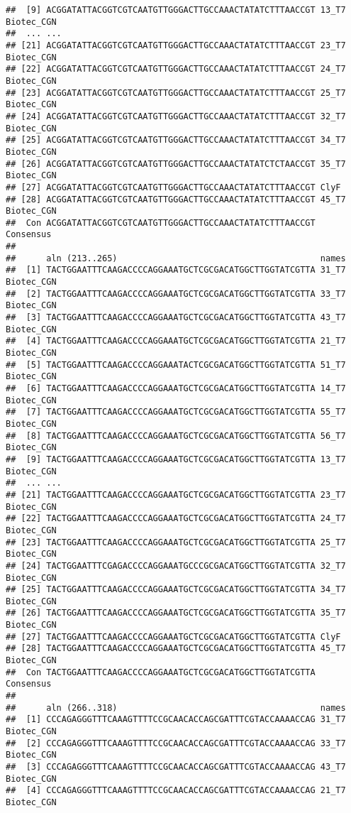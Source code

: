 \documentclass[
]{article}
\begin{document}
\begin{verbatim}
##  [9] ACGGATATTACGGTCGTCAATGTTGGGACTTGCCAAACTATATCTTTAACCGT 13_T7 Biotec_CGN 
##  ... ...
## [21] ACGGATATTACGGTCGTCAATGTTGGGACTTGCCAAACTATATCTTTAACCGT 23_T7 Biotec_CGN
## [22] ACGGATATTACGGTCGTCAATGTTGGGACTTGCCAAACTATATCTTTAACCGT 24_T7 Biotec_CGN
## [23] ACGGATATTACGGTCGTCAATGTTGGGACTTGCCAAACTATATCTTTAACCGT 25_T7 Biotec_CGN
## [24] ACGGATATTACGGTCGTCAATGTTGGGACTTGCCAAACTATATCTTTAACCGT 32_T7 Biotec_CGN
## [25] ACGGATATTACGGTCGTCAATGTTGGGACTTGCCAAACTATATCTTTAACCGT 34_T7 Biotec_CGN
## [26] ACGGATATTACGGTCGTCAATGTTGGGACTTGCCAAACTATATCTCTAACCGT 35_T7 Biotec_CGN
## [27] ACGGATATTACGGTCGTCAATGTTGGGACTTGCCAAACTATATCTTTAACCGT ClyF
## [28] ACGGATATTACGGTCGTCAATGTTGGGACTTGCCAAACTATATCTTTAACCGT 45_T7 Biotec_CGN
##  Con ACGGATATTACGGTCGTCAATGTTGGGACTTGCCAAACTATATCTTTAACCGT Consensus 
## 
##      aln (213..265)                                        names
##  [1] TACTGGAATTTCAAGACCCCAGGAAATGCTCGCGACATGGCTTGGTATCGTTA 31_T7 Biotec_CGN
##  [2] TACTGGAATTTCAAGACCCCAGGAAATGCTCGCGACATGGCTTGGTATCGTTA 33_T7 Biotec_CGN
##  [3] TACTGGAATTTCAAGACCCCAGGAAATGCTCGCGACATGGCTTGGTATCGTTA 43_T7 Biotec_CGN
##  [4] TACTGGAATTTCAAGACCCCAGGAAATGCTCGCGACATGGCTTGGTATCGTTA 21_T7 Biotec_CGN
##  [5] TACTGGAATTTCAAGACCCCAGGAAATACTCGCGACATGGCTTGGTATCGTTA 51_T7 Biotec_CGN
##  [6] TACTGGAATTTCAAGACCCCAGGAAATGCTCGCGACATGGCTTGGTATCGTTA 14_T7 Biotec_CGN
##  [7] TACTGGAATTTCAAGACCCCAGGAAATGCTCGCGACATGGCTTGGTATCGTTA 55_T7 Biotec_CGN
##  [8] TACTGGAATTTCAAGACCCCAGGAAATGCTCGCGACATGGCTTGGTATCGTTA 56_T7 Biotec_CGN
##  [9] TACTGGAATTTCAAGACCCCAGGAAATGCTCGCGACATGGCTTGGTATCGTTA 13_T7 Biotec_CGN 
##  ... ...
## [21] TACTGGAATTTCAAGACCCCAGGAAATGCTCGCGACATGGCTTGGTATCGTTA 23_T7 Biotec_CGN
## [22] TACTGGAATTTCAAGACCCCAGGAAATGCTCGCGACATGGCTTGGTATCGTTA 24_T7 Biotec_CGN
## [23] TACTGGAATTTCAAGACCCCAGGAAATGCTCGCGACATGGCTTGGTATCGTTA 25_T7 Biotec_CGN
## [24] TACTGGAATTTCGAGACCCCAGGAAATGCCCGCGACATGGCTTGGTATCGTTA 32_T7 Biotec_CGN
## [25] TACTGGAATTTCAAGACCCCAGGAAATGCTCGCGACATGGCTTGGTATCGTTA 34_T7 Biotec_CGN
## [26] TACTGGAATTTCAAGACCCCAGGAAATGCTCGCGACATGGCTTGGTATCGTTA 35_T7 Biotec_CGN
## [27] TACTGGAATTTCAAGACCCCAGGAAATGCTCGCGACATGGCTTGGTATCGTTA ClyF
## [28] TACTGGAATTTCAAGACCCCAGGAAATGCTCGCGACATGGCTTGGTATCGTTA 45_T7 Biotec_CGN
##  Con TACTGGAATTTCAAGACCCCAGGAAATGCTCGCGACATGGCTTGGTATCGTTA Consensus 
## 
##      aln (266..318)                                        names
##  [1] CCCAGAGGGTTTCAAAGTTTTCCGCAACACCAGCGATTTCGTACCAAAACCAG 31_T7 Biotec_CGN
##  [2] CCCAGAGGGTTTCAAAGTTTTCCGCAACACCAGCGATTTCGTACCAAAACCAG 33_T7 Biotec_CGN
##  [3] CCCAGAGGGTTTCAAAGTTTTCCGCAACACCAGCGATTTCGTACCAAAACCAG 43_T7 Biotec_CGN
##  [4] CCCAGAGGGTTTCAAAGTTTTCCGCAACACCAGCGATTTCGTACCAAAACCAG 21_T7 Biotec_CGN

\end{verbatim}
\end{document}
